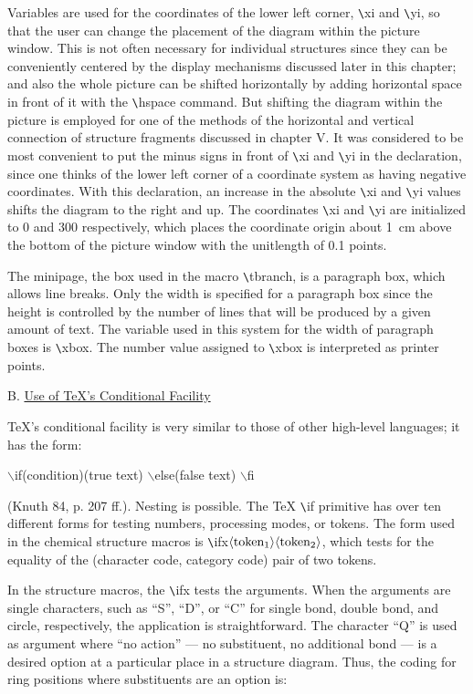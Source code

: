  Variables are used for the coordinates of the 
 lower left corner, \verb+\+xi and \verb+\+yi, so that the
 user can change the placement of the diagram within the
 picture window. This is not often necessary for individual
 structures since they can be conveniently centered by
 the display mechanisms discussed later in this chapter;
 and also the whole picture can be shifted horizontally by
 adding horizontal space in front of it with the 
 \verb+\+hspace command.  But shifting the diagram within
 the picture is employed for one of the methods of
 the horizontal and vertical
 connection of structure fragments discussed in chapter V.
 It was considered to be most convenient to put the minus
 signs in front of \verb+\+xi and \verb+\+yi in the declaration,
 since one thinks of the lower left corner of a coordinate
 system as having negative coordinates. With this declaration,
 an increase in the absolute \verb+\+xi and \verb+\+yi values
 shifts the diagram to the right and up. The coordinates
 \verb+\+xi and \verb+\+yi are initialized to 0 and 300
 respectively, which places the coordinate origin about 1~cm
 above the bottom of the picture window with the unitlength
 of 0.1 points.

 The minipage, the box used in the macro \verb+\+tbranch,
 is a paragraph box, which allows line breaks. Only the width
 is specified for a paragraph box since the height is
 controlled by the number of lines that will be produced by
 a given amount of text. The variable used in this system
 for the width of paragraph boxes is \verb+\+xbox. The number
 value assigned to \verb+\+xbox is interpreted as printer
 points.

 \pagebreak
 \vspace{0.4cm}
 \noindent B. \underline{Use of TeX's Conditional Facility}
 
 TeX's conditional facility is very similar to those of other
 high-level languages; it has the form: \\
 \centerline{$\backslash $if(condition)(true text)
  $\backslash $else(false text) $\backslash $fi  }
 (Knuth 84, p. 207 ff.).  Nesting is possible.
 The TeX \verb+\+if primitive has over ten different forms
 for testing numbers, processing modes, or tokens.
 The form used in the chemical structure macros is          
 \verb+\+ifx${\rm \langle token_{1}\rangle \langle
 token_{2}\rangle}$, which tests for the equality of the
 (character code, category code) pair of two tokens.
 
 In the structure macros, the \verb+\+ifx tests the
 arguments. When the arguments are single characters,
 such as ``S'', ``D'', or ``C'' for single bond, double
 bond, and circle, respectively, the application is    
 straightforward.  The character ``Q'' is used as argument
 where ``no action'' --- no substituent, no additional bond
 --- is a desired option at a particular place in a structure
 diagram. Thus, the coding for ring positions where substituents
 are an option is:


